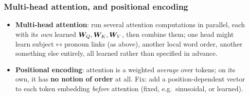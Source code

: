 \documentclass[10pt]{beamer}
\begin{document}
\begin{frame}[fragile]
\frametitle{Multi-head attention, and positional encoding}

\begin{itemize}
\item \textbf{Multi-head attention}: run several attention computations in
  parallel, each with its \emph{own} learned $\boldsymbol{W}_Q,\boldsymbol{W}_K,\boldsymbol{W}_V$, then combine
  them; one head might learn subject$\leftrightarrow$pronoun links (as
  above), another local word order, another something else entirely, all
  learned rather than specified in advance.
\end{itemize}

\begin{itemize}
\item \textbf{Positional encoding}: attention is a weighted \emph{average}
  over tokens; on its own, it has \textbf{no notion of order} at all.
  Fix: add a position-dependent vector to each token embedding
  \emph{before} attention (fixed, e.g.\ sinusoidal, or learned).
\end{itemize}

\end{frame}
\end{document}
